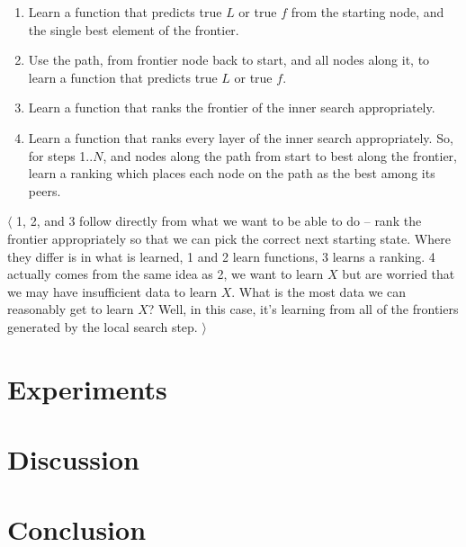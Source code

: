 \documentclass{report}
\newcommand{\note}[1]{$\langle$ #1 $\rangle$}
\begin{document}
\begin{enumerate}
  \item Learn a function that predicts true $L$ or true $f$ from the
    starting node, and the single best element of the frontier.
  \item Use the path, from frontier node back to start, and all nodes
    along it, to learn a function that predicts true $L$ or true $f$.
  \item Learn a function that ranks the frontier of the inner search
    appropriately.
  \item Learn a function that ranks every layer of the inner search
    appropriately.  So, for steps 1..$N$, and nodes along the path
    from start to best along the frontier, learn a ranking which
    places each node on the path as the best among its peers.
\end{enumerate}

\note{1, 2, and 3 follow directly from what we want to be able to do
  -- rank the frontier appropriately so that we can pick the correct
  next starting state.  Where they differ is in what is learned, 1 and
  2 learn functions, 3 learns a ranking. 4 actually comes from the
  same idea as 2, we want to learn $X$ but are worried that we may
  have insufficient data to learn $X$.  What is the most data we can
  reasonably get to learn $X$? Well, in this case, it's learning from
  all of the frontiers generated by the local search step.}

\section{Experiments}

\section{Discussion}

\section{Conclusion}
\end{document}
